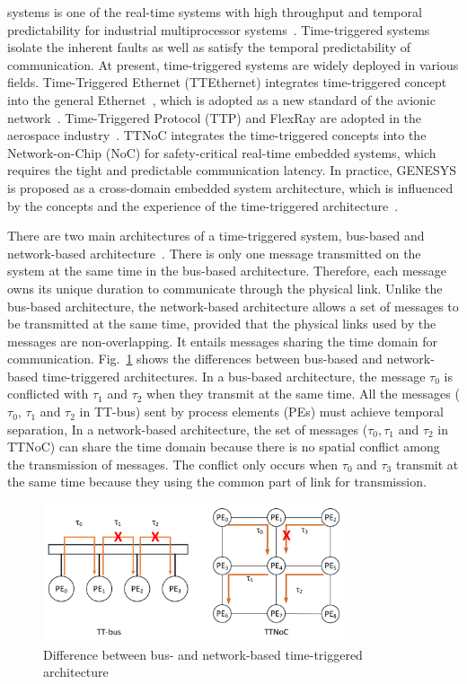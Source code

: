 \documentclass[10pt,journal]{IEEEtran}
\theoremstyle{remark}
\begin{document}
 systems is one of the real-time systems with high throughput and temporal predictability for industrial multiprocessor systems~\cite{DBLP:journals/rts/CraciunasO16}.
Time-triggered systems isolate the inherent faults as well as satisfy the temporal predictability of communication.
At present, time-triggered systems are widely deployed in various fields.
Time-Triggered Ethernet (TTEthernet) integrates time-triggered concept into the general Ethernet~\cite{DBLP:conf/nca/SteinerBHPV09}, which is adopted as a new standard of the avionic network~\cite{DBLP:conf/dsrt/BejiHGM14}. 
Time-Triggered Protocol (TTP) and FlexRay are adopted in the aerospace industry~\cite{DBLP:journals/taes/HuLWV15}.
TTNoC integrates the time-triggered concepts into the Network-on-Chip (NoC) for safety-critical real-time embedded systems, which requires the tight and predictable communication latency.
In practice,
 GENESYS is proposed as a cross-domain embedded system architecture,
  which is influenced by the concepts and the experience of the time-triggered architecture~\cite{DBLP:conf/ladc/Kopetz11}.

There are two main architectures of a time-triggered system,
 bus-based and network-based architecture~\cite{DBLP:conf/date/HuangBRBK12}.
There is only one message transmitted on the system at the same time in the bus-based architecture. 
Therefore,
 each message owns its unique duration to communicate through the physical link.
Unlike the bus-based architecture,
 the network-based architecture allows a set of messages to be transmitted at the same time,
 provided that the physical links used by the messages are non-overlapping.
It entails messages sharing the time domain for communication.
Fig.~\ref{f:diff} shows the differences between bus-based and network-based time-triggered architectures.
In a bus-based architecture, the message $\tau_0$ is conflicted with $\tau_1$ and $\tau_2$ when they transmit at the same time.
All the messages ($\tau_0$, $\tau_1$ and $\tau_2$ in TT-bus) sent by process elements (PEs) must achieve temporal separation,
In a network-based architecture,
 the set of messages ($\tau_0,\tau_1$ and $\tau_2$ in TTNoC) can share the time domain because there is no spatial conflict among the transmission of messages.
The conflict only occurs when $\tau_0$ and $\tau_3$ transmit at the same time because they using the common part of link for transmission.
\begin{figure}[!t]
	\centering
	\includegraphics[width=3.5in]{picture/difference.pdf}
	\caption{Difference between bus- and network-based time-triggered architecture}
	\label{f:diff}
\end{figure}
\end{document}

